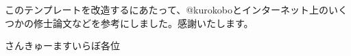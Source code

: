 \begin{acknowledgment}

このテンプレートを改造するにあたって、@kurokoboとインターネット上のいくつかの修士論文などを参考にしました。感謝いたします。

さんきゅーますいらぼ各位

\end{acknowledgment}
